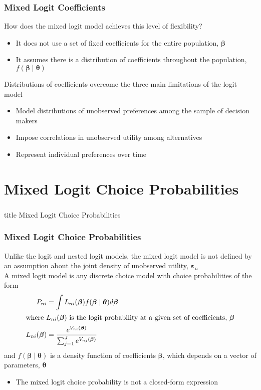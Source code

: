\documentclass{beamer}
\begin{document}
\begin{frame}\frametitle{Mixed Logit Coefficients}
    How does the mixed logit model achieves this level of flexibility?
    \begin{itemize}
        \item It does not use a set of fixed coefficients for the entire population, $\bm{\beta}$
        \item It assumes there is a distribution of coefficients throughout the population, $f(\bm{\beta} \mid \bm{\theta})$
    \end{itemize}
    \vspace{3ex}
    Distributions of coefficients overcome the three main limitations of the logit model
    \begin{itemize}
        \item Model distributions of unobserved preferences among the sample of decision makers
        \item Impose correlations in unobserved utility among alternatives
        \item Represent individual preferences over time
    \end{itemize}
\end{frame}

\section{Mixed Logit Choice Probabilities}
\label{prob}
\begin{frame}\frametitle{}
    \vfill
    \centering
    \begin{beamercolorbox}[center]{title}
        \Large Mixed Logit Choice Probabilities
    \end{beamercolorbox}
    \vfill
\end{frame}

\begin{frame}\frametitle{Mixed Logit Choice Probabilities}
	Unlike the logit and nested logit models, the mixed logit model is not defined by an assumption about the joint density of unobserved utility, $\bm{\varepsilon}_n$ \\
	\vspace{3ex}
    A mixed logit model is any discrete choice model with choice probabilities of the form
    \begin{align*}
        P_{ni} & = \int L_{ni}(\bm{\beta}) f(\bm{\beta} \mid \bm{\theta}) d \bm{\beta} \\
        \intertext{where $L_{ni}(\bm{\beta})$ is the logit probability at a given set of coefficients, $\bm{\beta}$}
        L_{ni}(\bm{\beta}) & = \frac{e^{V_{ni}(\bm{\beta})}}{\sum_{j = 1}^J e^{V_{nj}(\bm{\beta})}}
    \end{align*}
    and $f(\bm{\beta} \mid \bm{\theta})$ is a density function of coefficients $\bm{\beta}$, which depends on a vector of parameters, $\bm{\theta}$
    \begin{itemize}
    	\item The mixed logit choice probability is not a closed-form expression
    \end{itemize}
\end{frame}
\end{document}
